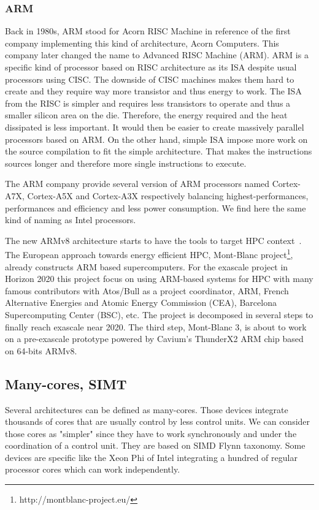 \subsubsection{ARM}
Back in 1980s, ARM stood for Acorn RISC Machine in reference of the first company implementing this kind of architecture, Acorn Computers. 
This company later changed the name to Advanced RISC Machine (ARM). 
ARM is a specific kind of processor based on RISC architecture as its ISA despite usual processors using CISC.
The downside of CISC machines makes them hard to create and they require way more transistor and thus energy to work. 
The ISA from the RISC is simpler and requires less transistors to operate and thus a smaller silicon area on the die.
Therefore, the energy required and the heat dissipated is less important. 
It would then be easier to create massively parallel processors based on ARM. 
On the other hand, simple ISA impose more work on the source compilation to fit the simple architecture. 
That makes the instructions sources longer and therefore more single instructions to execute. 

The ARM company provide several version of ARM processors named Cortex-A7X, Cortex-A5X and Cortex-A3X respectively balancing highest-performances, performances and efficiency and less power consumption. 
We find here the same kind of naming as Intel processors. 

The new ARMv8 architecture starts to have the tools to target HPC context~\cite{rico2017arm}.
The European approach towards energy efficient HPC, Mont-Blanc project\footnote{http://montblanc-project.eu/}, already constructs ARM based supercomputers. 
For the exascale project in Horizon 2020 this project focus on using ARM-based systems for HPC with many famous contributors with Atos/Bull as a project coordinator, ARM, French Alternative Energies and Atomic Energy Commission (CEA), Barcelona Supercomputing Center (BSC), etc.
The project is decomposed in several steps to finally reach exascale near 2020. 
The third step, Mont-Blanc 3, is about to work on a pre-exascale prototype powered by Cavium’s ThunderX2 ARM chip based on 64-bits ARMv8.

\subsection{Many-cores, SIMT}
Several architectures can be defined as many-cores. 
Those devices integrate thousands of cores that are usually control by less control units. 
We can consider those cores as "simpler" since they have to work synchronously and under the coordination of a control unit.
They are based on SIMD Flynn taxonomy. 
Some devices are specific like the Xeon Phi of Intel integrating a hundred of regular processor cores which can work independently. 

